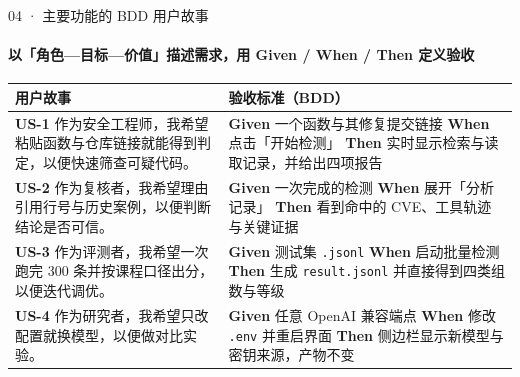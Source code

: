 \documentclass{beamer}
\begin{document}
\begin{frame}{04 · 主要功能的 BDD 用户故事}
\framesubtitle{以「角色—目标—价值」描述需求，用 Given / When / Then 定义验收}
\tiny
\begin{tabular}{@{}p{}p{}@{}}
\toprule
\textbf{用户故事} & \textbf{验收标准（BDD）} \\
\midrule
\textbf{US-1} 作为安全工程师，我希望粘贴函数与仓库链接就能得到判定，以便快速筛查可疑代码。
& \textbf{Given} 一个函数与其修复提交链接\quad
  \textbf{When} 点击「开始检测」\quad
  \textbf{Then} 实时显示检索与读取记录，并给出四项报告 \\
\addlinespace[1pt]
\textbf{US-2} 作为复核者，我希望理由引用行号与历史案例，以便判断结论是否可信。
& \textbf{Given} 一次完成的检测\quad
  \textbf{When} 展开「分析记录」\quad
  \textbf{Then} 看到命中的 CVE、工具轨迹与关键证据 \\
\addlinespace[1pt]
\textbf{US-3} 作为评测者，我希望一次跑完 300 条并按课程口径出分，以便迭代调优。
& \textbf{Given} 测试集 \texttt{.jsonl}\quad
  \textbf{When} 启动批量检测\quad
  \textbf{Then} 生成 \texttt{result.jsonl} 并直接得到四类组数与等级 \\
\addlinespace[1pt]
\textbf{US-4} 作为研究者，我希望只改配置就换模型，以便做对比实验。
& \textbf{Given} 任意 OpenAI 兼容端点\quad
  \textbf{When} 修改 \texttt{.env} 并重启界面\quad
  \textbf{Then} 侧边栏显示新模型与密钥来源，产物不变 \\
\bottomrule
\end{tabular}
\end{frame}
\end{document}
